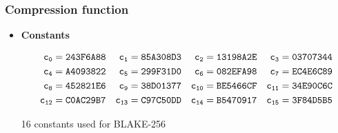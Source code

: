   \subsubsection{Compression function}

  \begin{itemize}
    \item {\bf Constants}
      
      \begin{table}[H]
        \begin{align*}
             {\tt c_{0}}  &= {\tt 243F6A88} & {\tt c_{1}}  &= {\tt 85A308D3} & {\tt c_{2}}  &= {\tt 13198A2E} & {\tt c_{3}}  &= {\tt 03707344}
          \\ {\tt c_{4}}  &= {\tt A4093822} & {\tt c_{5}}  &= {\tt 299F31D0} & {\tt c_{6}}  &= {\tt 082EFA98} & {\tt c_{7}}  &= {\tt EC4E6C89} 
          \\ {\tt c_{8}}  &= {\tt 452821E6} & {\tt c_{9}}  &= {\tt 38D01377} & {\tt c_{10}} &= {\tt BE5466CF} & {\tt c_{11}} &= {\tt 34E90C6C} 
          \\ {\tt c_{12}} &= {\tt C0AC29B7} & {\tt c_{13}} &= {\tt C97C50DD} & {\tt c_{14}} &= {\tt B5470917} & {\tt c_{15}} &= {\tt 3F84D5B5} 
        \end{align*}
        \caption{16 constants used for BLAKE-256 \cite{00002}}
      \end{table}


\end{itemize}
